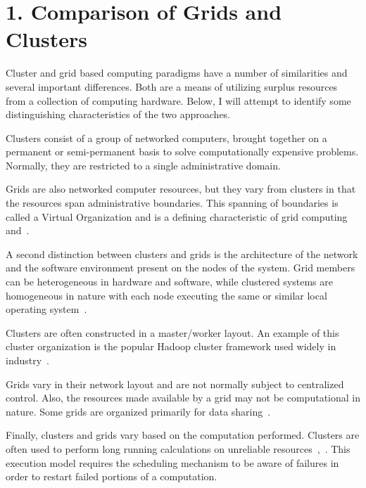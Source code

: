 \documentclass[12pt]{article}
\date{\today}
\begin{document}
\maketitle

\section*{1. Comparison of Grids and Clusters}
Cluster and grid based computing paradigms have a number of
similarities and several important differences. Both are a means of
utilizing surplus resources from a collection of computing
hardware. Below, I will attempt to identify some distinguishing
characteristics of the two approaches.

Clusters consist of a group of networked computers, brought together
on a permanent or semi-permanent basis to solve computationally
expensive problems.  Normally, they are restricted to a single
administrative domain.

Grids are also networked computer resources, but they vary from
clusters in that the resources span administrative boundaries. This
spanning of boundaries is called a Virtual Organization and is a
defining characteristic of grid computing~\cite{classtext}
and~\cite{anatomy}.

A second distinction between clusters and grids is the architecture of
the network and the software environment present on the nodes of the
system. Grid members can be heterogeneous in hardware and software,
while clustered systems are homogeneous in nature with each node
executing the same or similar local operating system~\cite{classtext}.

Clusters are often constructed in a master/worker layout. An example
of this cluster organization is the popular Hadoop cluster framework
used widely in industry~\cite{hadoop}.

Grids vary in their network layout and are not normally subject to
centralized control.  Also, the resources made available by a grid may
not be computational in nature. Some grids are organized primarily for
data sharing~\cite{anatomy}.

Finally, clusters and grids vary based on the computation performed.
Clusters are often used to perform long running calculations on
unreliable resources~\cite{hadoop},~\cite{condor-man}. This execution
model requires the scheduling mechanism to be aware of failures in
order to restart failed portions of a computation.
\end{document}
